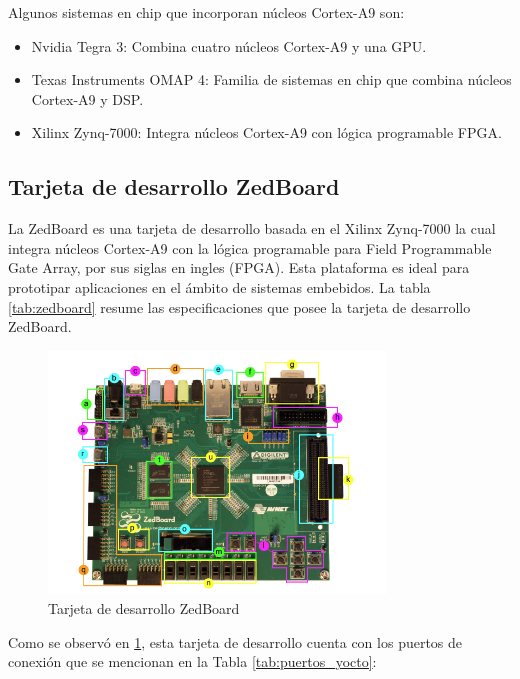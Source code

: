 Algunos sistemas en chip que incorporan núcleos Cortex-A9 son:

\begin{itemize}
    \item Nvidia Tegra 3: Combina cuatro núcleos Cortex-A9 y una GPU.
    \item Texas Instruments OMAP 4: Familia de sistemas en chip que combina núcleos Cortex-A9 y DSP.
    \item Xilinx Zynq-7000: Integra núcleos Cortex-A9 con lógica programable FPGA.
\end{itemize}

\subsection{Tarjeta de desarrollo ZedBoard}

La ZedBoard es una tarjeta de desarrollo basada en el Xilinx Zynq-7000 la cual integra núcleos Cortex-A9 con la lógica programable para Field Programmable Gate Array, por sus siglas en ingles (FPGA). Esta plataforma es ideal para prototipar aplicaciones en el ámbito de sistemas embebidos. La tabla \ref{tab:zedboard} resume las especificaciones que posee la tarjeta de desarrollo ZedBoard.


\begin{figure}[h!]
    \centering
    \includegraphics[width=0.8\textwidth]{fig/teorico/zedboard_raw.png}
    \caption{Tarjeta de desarrollo ZedBoard}
    \label{fig:zedboard_raw_info}
\end{figure}

Como se observó en \ref{fig:zedboard_raw_info}, esta tarjeta de desarrollo cuenta con los puertos de conexión que se mencionan en la Tabla \ref{tab:puertos_yocto}: 


